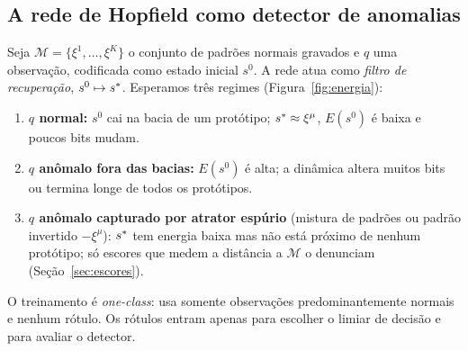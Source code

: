 \subsection{A rede de Hopfield como detector de anomalias}\label{sec:conceito}
Seja $\mathcal M=\{\xi^1,\dots,\xi^K\}$ o conjunto de padrões normais gravados e $q$ uma observação,
codificada como estado inicial $s^0$. A rede atua como \emph{filtro de recuperação}, $s^0\mapsto s^{\ast}$.
Esperamos três regimes (Figura~\ref{fig:energia}):
\begin{enumerate}
  \item \textbf{$q$ normal:} $s^0$ cai na bacia de um protótipo; $s^{\ast}\approx\xi^\mu$, $E(s^0)$ é baixa e
        poucos bits mudam.
  \item \textbf{$q$ anômalo fora das bacias:} $E(s^0)$ é alta; a dinâmica altera muitos bits ou termina longe
        de todos os protótipos.
  \item \textbf{$q$ anômalo capturado por atrator espúrio} (mistura de padrões ou padrão invertido
        $-\xi^\mu$): $s^{\ast}$ tem energia baixa mas não está próximo de nenhum protótipo; só escores que medem
        a distância a $\mathcal M$ o denunciam (Seção~\ref{sec:escores}).
\end{enumerate}
O treinamento é \emph{one-class}: usa somente observações predominantemente normais e nenhum rótulo. Os
rótulos entram apenas para escolher o limiar de decisão e para avaliar o detector.

